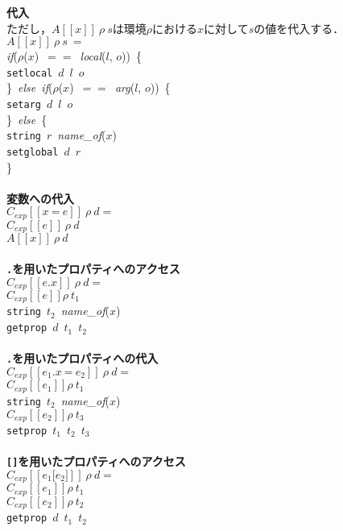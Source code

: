 \documentclass[a4j,12pt]{jarticle}
\begin{document}
{\begin{tabbing}
\textbf{代入} \\
  ただし，$A[[x]]\ \rho\ s$は環境$\rho$における$x$に対して$s$の値を代入する． \\
\>$A[[x]]\ \rho\ s\ =$\\
\>\>\textit{if}($\rho$($x$)\ $==$\ \textit{local}($l$, $o$))\ \{ \\
\>\>\>\texttt{setlocal}\ $d$\ $l$\ $o$ \\
\>\>\}\ \textit{else\ if}($\rho$($x$)\ $==$\ \textit{arg}($l$, $o$))\ \{ \\
\>\>\>\texttt{setarg}\ $d$\ $l$\ $o$ \\
\>\>\}\ \textit{else}\ \{ \\
\>\>\>\texttt{string}\ $r$\ \textit{name\_of}($x$) \\
\>\>\>\texttt{setglobal}\ $d$\ $r$ \\
\>\>\} \\
\\

\textbf{変数への代入} \\
\>$C_{exp}[[x\ \texttt{=}\ e]]\ \rho\ d =$ \\
\>\>$C_{exp}[[e]]\ \rho\ d$ \\
\>\>$A[[x]]\ \rho\ d$ \\
\\

\textbf{\texttt{.}を用いたプロパティへのアクセス} \\
\>$C_{exp}[[e\texttt{.}x]]\ \rho\ d =$ \\
\>\>$C_{exp}[[e]] \rho\ t_1$ \\
\>\>\texttt{string}\ $t_2$\ \textit{name\_of}($x$) \\
\>\>\texttt{getprop}\ $d$\ $t_1$\ $t_2$ \\
\\

\textbf{\texttt{.}を用いたプロパティへの代入} \\
\>$C_{exp}[[e_1\texttt{.}x\ \texttt{=}\ e_2]]\ \rho\ d=$ \\
\>\>$C_{exp}[[e_1]] \rho\ t_1$ \\
\>\>\texttt{string}\ $t_2$\ \textit{name\_of}($x$) \\
\>\>$C_{exp}[[e_2]] \rho\ t_3$ \\
\>\>\texttt{setprop}\ $t_1$\ $t_2$\ $t_3$ \\
\\

\textbf{\texttt{[]}を用いたプロパティへのアクセス} \\
\>$C_{exp}[[e_1\texttt{[}e_2\texttt{]}]]\ \rho\ d=$ \\
\>\>$C_{exp}[[e_1]] \rho\ t_1$ \\
\>\>$C_{exp}[[e_2]] \rho\ t_2$ \\
\>\>\texttt{getprop}\ $d$\ $t_1$\ $t_2$ \\
\\


\end{tabbing}}
\end{document}
